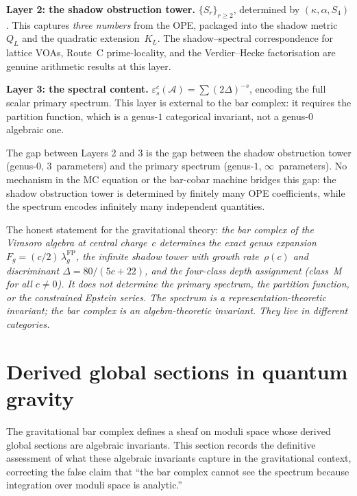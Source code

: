 \documentclass[11pt]{article}
\newcommand{\cA}{\mathcal{A}}
\begin{document}
\textbf{Layer 2: the shadow obstruction tower.}
$\{S_r\}_{r \geq 2}$, determined by $(\kappa, \alpha, S_4)$.
This captures \emph{three numbers} from the OPE, packaged into
the shadow metric~$Q_L$ and the quadratic extension~$K_L$.  The
shadow--spectral correspondence for lattice VOAs, Route~C
prime-locality, and the Verdier--Hecke factorisation are genuine
arithmetic results at this layer.

\textbf{Layer 3: the spectral content.}
$\varepsilon^c_s(\cA) = \sum (2\Delta)^{-s}$, encoding the full
scalar primary spectrum.  This layer is external to the bar
complex: it requires the partition function, which is a
genus-$1$ categorical invariant, not a genus-$0$ algebraic one.

The gap between Layers 2 and 3 is the gap between the
shadow obstruction tower (genus-$0$, $3$~parameters) and the primary spectrum
(genus-$1$, $\infty$~parameters).  No mechanism in the MC equation
or the bar-cobar machine bridges this gap: the shadow obstruction tower is
determined by finitely many OPE coefficients, while the spectrum
encodes infinitely many independent quantities.

The honest statement for the gravitational theory:
\emph{the bar complex of the Virasoro algebra at central
charge~$c$ determines the exact genus expansion
$F_g = (c/2)\,\lambda_g^{\mathrm{FP}}$, the infinite shadow
tower with growth rate~$\rho(c)$ and discriminant
$\Delta = 80/(5c{+}22)$, and the four-class depth assignment
(class~M for all $c \neq 0$).  It does not determine the
primary spectrum, the partition function, or the constrained
Epstein series.  The spectrum is a representation-theoretic
invariant; the bar complex is an algebra-theoretic invariant.
They live in different categories.}


\section{Derived global sections in quantum gravity}
\label{sec:derived-global-sections-qg}

The gravitational bar complex defines a sheaf on moduli space
whose derived global sections are algebraic invariants.  This
section records the definitive assessment of what these
algebraic invariants capture in the gravitational context,
correcting the false claim that ``the bar complex cannot see the
spectrum because integration over moduli space is analytic.''
\end{document}
